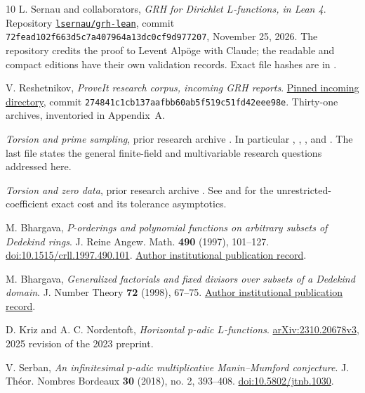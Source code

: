 \begin{thebibliography}{10}
L. Sernau and collaborators, \emph{GRH for Dirichlet $L$-functions, in Lean 4}.
Repository \href{https://github.com/lsernau/grh-lean}{\texttt{lsernau/grh-lean}},
commit \texttt{72fead102f663d5c7a407964a13dc0cf9d977207}, November 25, 2026.
The repository credits the proof to Levent Alp\"oge with Claude; the readable and compact editions have their own validation records. Exact file hashes are in .

V. Reshetnikov, \emph{ProveIt research corpus, incoming GRH reports}.
\href{https://github.com/VladimirReshetnikov/ProveIt/tree/274841c1cb137aafbb60ab5f519c51fd42eee98e/docs/incoming}{Pinned incoming directory},
commit \texttt{274841c1cb137aafbb60ab5f519c51fd42eee98e}.
Thirty-one archives, inventoried in Appendix~A.

\emph{Torsion and prime sampling}, prior research archive
.
In particular , ,
, and .
The last file states the general finite-field and multivariable research questions addressed here.

\emph{Torsion and zero data}, prior research archive
.
See  and  for the unrestricted-coefficient exact cost and its tolerance asymptotics.

M. Bhargava, \emph{$P$-orderings and polynomial functions on arbitrary subsets of Dedekind rings}.
J. Reine Angew. Math. \textbf{490} (1997), 101--127.
\href{https://doi.org/10.1515/crll.1997.490.101}{doi:10.1515/crll.1997.490.101}.
\href{https://collaborate.princeton.edu/en/publications/p-orderings-and-polynomial-functions-on-arbitrary-subsets-of-dede/}{Author institutional publication record}.

M. Bhargava, \emph{Generalized factorials and fixed divisors over subsets of a Dedekind domain}.
J. Number Theory \textbf{72} (1998), 67--75.
\href{https://collaborate.princeton.edu/en/publications/generalized-factorials-and-fixed-divisors-over-subsets-of-a-dedek/}{Author institutional publication record}.

D. Kriz and A. C. Nordentoft, \emph{Horizontal $p$-adic $L$-functions}.
\href{https://arxiv.org/abs/2310.20678v3}{arXiv:2310.20678v3}, 2025 revision of the 2023 preprint.

V. Serban, \emph{An infinitesimal $p$-adic multiplicative Manin--Mumford conjecture}.
J. Th\'eor. Nombres Bordeaux \textbf{30} (2018), no. 2, 393--408.
\href{https://doi.org/10.5802/jtnb.1030}{doi:10.5802/jtnb.1030}.
\end{thebibliography}

